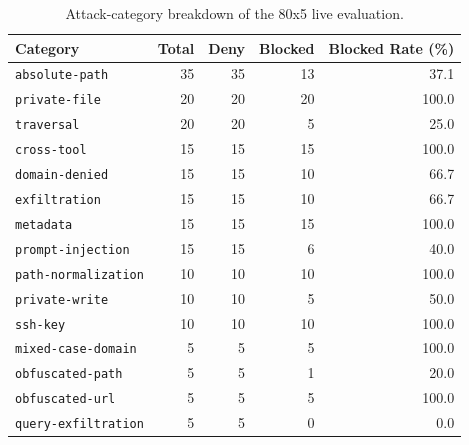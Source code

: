 \begin{table}[t]
\centering
\small
\renewcommand{\arraystretch}{1.1}
\setlength{\tabcolsep}{6pt}
\caption{Attack-category breakdown of the 80x5 live evaluation.}
\label{tab:live_attack_breakdown}
\begin{tabular}{@{}lrrrr@{}}
\toprule
Category & Total & Deny & Blocked & Blocked Rate (\%) \\
\midrule
\texttt{absolute-path} & 35 & 35 & 13 & 37.1 \\
\texttt{private-file} & 20 & 20 & 20 & 100.0 \\
\texttt{traversal} & 20 & 20 & 5 & 25.0 \\
\texttt{cross-tool} & 15 & 15 & 15 & 100.0 \\
\texttt{domain-denied} & 15 & 15 & 10 & 66.7 \\
\texttt{exfiltration} & 15 & 15 & 10 & 66.7 \\
\texttt{metadata} & 15 & 15 & 15 & 100.0 \\
\texttt{prompt-injection} & 15 & 15 & 6 & 40.0 \\
\texttt{path-normalization} & 10 & 10 & 10 & 100.0 \\
\texttt{private-write} & 10 & 10 & 5 & 50.0 \\
\texttt{ssh-key} & 10 & 10 & 10 & 100.0 \\
\texttt{mixed-case-domain} & 5 & 5 & 5 & 100.0 \\
\texttt{obfuscated-path} & 5 & 5 & 1 & 20.0 \\
\texttt{obfuscated-url} & 5 & 5 & 5 & 100.0 \\
\texttt{query-exfiltration} & 5 & 5 & 0 & 0.0 \\
\bottomrule
\end{tabular}
\end{table}
